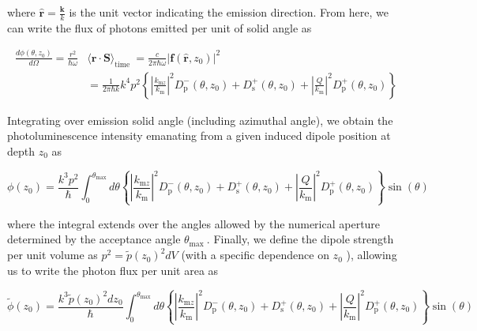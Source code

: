 \documentclass[10pt]{article}
\begin{document}
where $\hat{\boldsymbol{r}}=\frac{\boldsymbol{k}}{k}$ is the unit vector indicating the emission direction. From here, we can write the flux of photons emitted per unit of solid angle as

$$
\begin{aligned}
\frac{d \phi\left(\theta, z_{0}\right)}{d \Omega}=\frac{r^{2}}{\hbar \omega} & \langle\hat{\boldsymbol{r}} \cdot \boldsymbol{S}\rangle_{\text {time }}=\frac{c}{2 \pi \hbar \omega}\left|\boldsymbol{f}\left(\hat{\boldsymbol{r}}, z_{0}\right)\right|^{2} \\
& =\frac{1}{2 \pi \hbar k} k^{4} p^{2}\left\{\left|\frac{k_{\mathrm{m} z}}{k_{\mathrm{m}}}\right|^{2} D_{\mathrm{p}}^{-}\left(\theta, z_{0}\right)+D_{\mathrm{s}}^{+}\left(\theta, z_{0}\right)+\left|\frac{Q}{k_{\mathrm{m}}}\right|^{2} D_{\mathrm{p}}^{+}\left(\theta, z_{0}\right)\right\}
\end{aligned}
$$

Integrating over emission solid angle (including azimuthal angle), we obtain the photoluminescence intensity emanating from a given induced dipole position at depth $z_{0}$ as


\begin{equation*}
\phi\left(z_{0}\right)=\frac{k^{3} p^{2}}{\hbar} \int_{0}^{\theta_{\max }} d \theta\left\{\left|\frac{k_{\mathrm{m} z}}{k_{\mathrm{m}}}\right|^{2} D_{\mathrm{p}}^{-}\left(\theta, z_{0}\right)+D_{\mathrm{s}}^{+}\left(\theta, z_{0}\right)+\left|\frac{Q}{k_{\mathrm{m}}}\right|^{2} D_{\mathrm{p}}^{+}\left(\theta, z_{0}\right)\right\} \sin (\theta) \tag{S2}
\end{equation*}


where the integral extends over the angles allowed by the numerical aperture determined by the acceptance angle $\theta_{\text {max }}$. Finally, we define the dipole strength per unit volume as $p^{2}=\tilde{p}\left(z_{0}\right)^{2} d V$ (with a specific dependence on $z_{0}$ ), allowing us to write the photon flux per unit area as

$$
\tilde{\phi}\left(z_{0}\right)=\frac{k^{3} \tilde{p}\left(z_{0}\right)^{2} d z_{0}}{\hbar} \int_{0}^{\theta_{\max }} d \theta\left\{\left|\frac{k_{\mathrm{m} z}}{k_{\mathrm{m}}}\right|^{2} D_{\mathrm{p}}^{-}\left(\theta, z_{0}\right)+D_{\mathrm{s}}^{+}\left(\theta, z_{0}\right)+\left|\frac{Q}{k_{\mathrm{m}}}\right|^{2} D_{\mathrm{p}}^{+}\left(\theta, z_{0}\right)\right\} \sin (\theta)
$$
\end{document}
